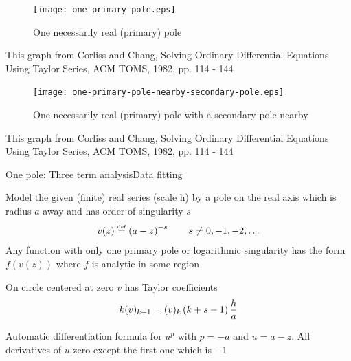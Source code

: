 \documentclass[11pt,svgnames,fleqn]{beamer}
\newcommand{\DM}[1]{\begin{displaymath} {#1} \end{displaymath}}
\begin{document}
  
\begin{frame}

\begin{figure}
  \centering
  \vspace{-0.4cm}
  \texttt{[image: one-primary-pole.eps]} %
  \caption{One necessarily real (primary) pole}
\end{figure}

  {\footnotesize This graph from Corliss and Chang, Solving Ordinary Differential Equations 
  Using Taylor Series, ACM TOMS, 1982, pp. 114 - 144}
\end{frame}

\begin{frame}

\begin{figure}
  \centering
  \vspace{-0.4cm}
  \texttt{[image: one-primary-pole-nearby-secondary-pole.eps]} %
  \caption{One necessarily real (primary) pole with a secondary pole nearby}
\end{figure}

  {\footnotesize This graph from Corliss and Chang, Solving Ordinary Differential Equations 
  Using Taylor Series, ACM TOMS, 1982, pp. 114 - 144}
\end{frame}

\begin{frame}{One pole: Three term analysis}{Data fitting}

  Model the given (finite) real series (scale h) by a pole on the real axis which is radius $a$ away
  and has order of singularity $s$
  \DM
  {
    v(z) \defeq \parbg{a-z}^{-s}  \qquad s \neq 0, -1, -2, \ldots
  }
  Any function with only one primary pole or logarithmic singularity
  has the form $f(v(z))$ where $f$ is analytic in some region

  \vspace{2mm}

  On circle centered at zero $v$ has Taylor coefficients 
  \DM
  {
    k \tc{v}{k+1} = \tc{v}{k}\parbg{k+s-1}\frac{h}{a}
  }
 
  Automatic differentiation formula for $u^p$ with $p=-a$ and $u=a-z$. All derivatives of $u$ zero
  except the first one which is $-1$
\end{frame}
\end{document}
